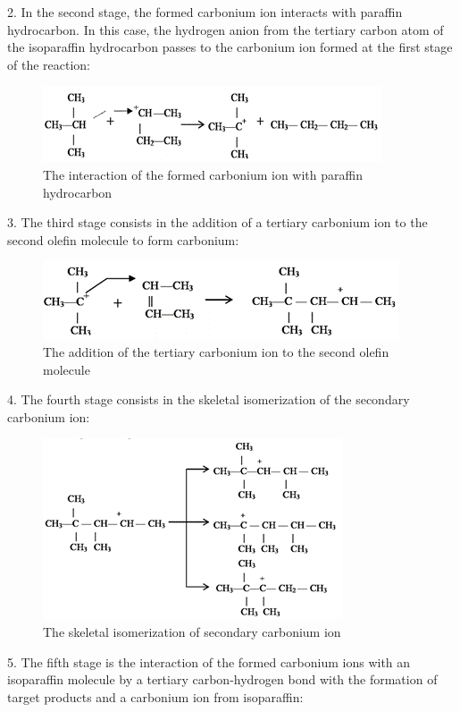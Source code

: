 \documentclass{svproc}
\begin{document}
2. In the second stage, the formed carbonium ion interacts with paraffin hydrocarbon. In this case, the hydrogen anion from the tertiary carbon atom of the isoparaffin hydrocarbon passes to the carbonium ion formed at the first stage of the reaction:

\begin{figure}
\centering
\includegraphics[]{fig2.png}
\caption{The interaction of the formed carbonium ion with paraffin hydrocarbon}
\label{fig2}
\end{figure}

3. The third stage consists in the addition of a tertiary carbonium ion to the second olefin molecule to form carbonium:

\begin{figure}
\centering
\includegraphics[]{fig3.png}
\caption{The addition of the tertiary carbonium ion to the second olefin molecule}
\label{fig3}
\end{figure}

4. The fourth stage consists in the skeletal isomerization of the secondary carbonium ion:

\begin{figure}
\centering
\includegraphics[height=4.3 cm]{fig4.png}
\caption{The skeletal isomerization of secondary carbonium ion}
\label{fig4}
\end{figure}

5. The fifth stage is the interaction of the formed carbonium ions with an isoparaffin molecule by a tertiary carbon-hydrogen bond with the formation of target products and a carbonium ion from isoparaffin:
\end{document}
